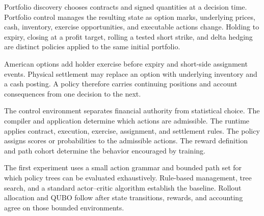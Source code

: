 \documentclass{strategynet-journal}
\begin{document}
\begin{SNcolumns}

Portfolio discovery chooses contracts and signed quantities at a decision
time.  Portfolio control manages the resulting state as option marks,
underlying prices, cash, inventory, exercise opportunities, and executable
actions change.  Holding to expiry, closing at a profit target, rolling a
tested short strike, and delta hedging are distinct policies applied to the
same initial portfolio.

American options add holder exercise before expiry and short-side assignment
events.  Physical settlement may replace an option with underlying inventory
and a cash posting.  A policy therefore carries continuing positions and
account consequences from one decision to the next.

The control environment separates financial authority from statistical
choice.  The compiler and application determine which actions are admissible.
The runtime applies contract, execution, exercise, assignment, and settlement
rules.  The policy assigns scores or probabilities to the admissible actions.
The reward definition and path cohort determine the behavior encouraged by
training.

The first experiment uses a small action grammar and bounded path set for
which policy trees can be evaluated exhaustively.  Rule-based management,
tree search, and a standard actor--critic algorithm establish the baseline.
Rollout allocation and QUBO follow after state transitions, rewards, and
accounting agree on those bounded environments.

\end{SNcolumns}
\end{document}

